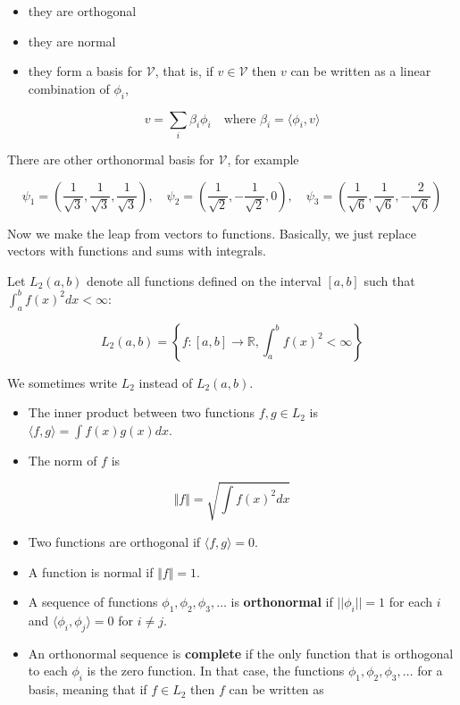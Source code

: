 \begin{itemize}[tightlist]
\item
  they are orthogonal
\item
  they are normal
\item
  they form a basis for \(\mathcal{V}\), that is, if
  \(v \in \mathcal{V}\) then \(v\) can be written as a linear
  combination of \(\phi_i\),
\end{itemize}

\[v = \sum_i \beta_i \phi_i
\quad \text{where } \beta_i = \langle \phi_i, v \rangle\]

There are other orthonormal basis for \(\mathcal{V}\), for example

\[ \psi_1 = \left( \frac{1}{\sqrt{3}}, \frac{1}{\sqrt{3}} , \frac{1}{\sqrt{3}} \right),
\quad
\psi_2 = \left( \frac{1}{\sqrt{2}}, -\frac{1}{\sqrt{2}} , 0 \right),
\quad
\psi_3 = \left( \frac{1}{\sqrt{6}}, \frac{1}{\sqrt{6}} , -\frac{2}{\sqrt{6}} \right)
\]

Now we make the leap from vectors to functions. Basically, we just
replace vectors with functions and sums with integrals.

Let \(L_2(a, b)\) denote all functions defined on the interval
\([a, b]\) such that \(\int_a^b f(x)^2 dx < \infty\):

\[ L_2(a, b) = \left\{ f: [a, b] \rightarrow \mathbb{R} , \int_a^b f(x)^2 < \infty \right\} \]

We sometimes write \(L_2\) instead of \(L_2(a, b)\).

\begin{itemize}[tightlist]
\item
  The inner product between two functions \(f, g \in L_2\) is
  \(\langle f, g \rangle = \int f(x) g(x) dx\).
\item
  The norm of \(f\) is
\end{itemize}

\[ \Vert f \Vert = \sqrt{\int f(x)^2 dx} \]

\begin{itemize}[tightlist]
\item
  Two functions are orthogonal if \(\langle f, g \rangle = 0\).
\item
  A function is normal if \(\Vert f \Vert = 1\).
\item
  A sequence of functions \(\phi_1, \phi_2, \phi_3, \dots\) is
  \textbf{orthonormal} if \(|| \phi_i || = 1\) for each \(i\) and
  \(\langle \phi_i, \phi_j \rangle = 0\) for \(i \neq j\).
\item
  An orthonormal sequence is \textbf{complete} if the only function that
  is orthogonal to each \(\phi_i\) is the zero function. In that case,
  the functions \(\phi_1, \phi_2, \phi_3, \dots\) for a basis, meaning
  that if \(f \in L_2\) then \(f\) can be written as
\end{itemize}

